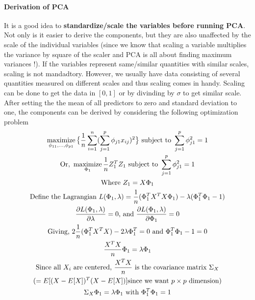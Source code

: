 \documentclass[../statistical_learning_notes.tex]{subfiles}
\begin{document}
    \paragraph{Derivation of PCA}
    It is a good idea to \textbf{standardize/scale the variables before running PCA}. Not only is it easier to derive the components, but they are also unaffected by the scale of the individual variables (since we know that scaling a variable multiplies the variance by square of the scaler and PCA is all about finding maximum variances !). If the variables represent same/similar quantities with similar scales, scaling is not mandadtory. However, we usually have data consisting of several quantities measured on different scales and thus scaling comes in handy. Scaling can be done to get the data in $[0,1]$ or by divinding by $\sigma$ to get similar scale.\newline \newline
    After setting the the mean of all predictors to zero and standard deviation to one, the components can be derived by considering the following optimization problem
    \begin{gather*}
        \operatorname*{maximize}_{\phi_{11},\ldots,\phi_{p1}} \big\{ \frac{1}{n} \sum_{i=1}^{n} (\sum_{j=1}^{p}\phi_{j1}x_{ij})^{2} \big\} \text{ subject to } \sum_{j=1}^{p} \phi_{j1}^{2} = 1\\
        \text{Or, } \operatorname*{maximize}_{\Phi_{1}} \frac{1}{n} Z_{1}^{T}Z_{1} \text{ subject to } \sum_{j=1}^{p} \phi_{j1}^{2} = 1\\
        \text{Where } Z_{1} = X\Phi_{1}\\
        \text{Define the Lagrangian } L(\Phi_{1}, \lambda) = \frac{1}{n} (\Phi_{1}^{T}X^{T}X\Phi_{1}) - \lambda (\Phi_{1}^{T}\Phi_{1} - 1)\\
        \frac{\partial L(\Phi_{1}, \lambda)}{\partial \lambda} = 0 \text{, and } \frac{\partial L(\Phi_{1}, \lambda)}{\partial \Phi_{1}} = 0 \\
        \text{Giving, } 2\frac{1}{n}(\Phi_{1}^{T}X^{T}X) - 2\lambda \Phi_{1}^{T} = 0 \text{ and } \Phi_{1}^{T}\Phi_{1} - 1 = 0\\
        \frac{X^{T}X}{n}\Phi_{1} = \lambda \Phi_{1}\\
        \text{Since all } X_{i} \text{ are centered, } \frac{X^{T}X}{n} \text{ is the covariance matrix } \Sigma_{X}\\
         (=E[(X-E[X])^{T}(X - E[X])] \text{since we want $p\times p$ dimension})\\
        \Sigma_{X} \Phi_{1} = \lambda \Phi_{1} \text{ with } \Phi_{1}^{T}\Phi_{1} = 1\\
    \end{gather*}
\end{document}
